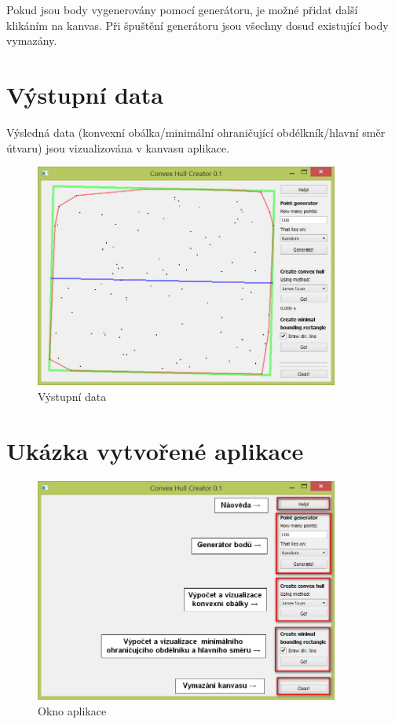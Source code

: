\documentclass[a4paper, 12pt]{article}
\begin{document}
Pokud jsou body vygenerovány pomocí generátoru, je možné přidat další klikáním na kanvas.
Při špuštění generátoru jsou všechny dosud existující body vymazány.

\clearpage
\section{Výstupní data}
Výsledná data (konvexní obálka/minimální ohraničující obdélkník/hlavní směr útvaru) jsou vizualizována v kanvasu aplikace.   \\
\begin{figure}[h]
	\centering
	\includegraphics[width=10cm]{min_bound.jpg}
	\caption{Výstupní data}
\end{figure}


\clearpage
\section{Ukázka vytvořené aplikace}
\begin{figure}[h!]
	\centering
	\includegraphics[width=10cm]{popis.jpg}
	\caption{Okno aplikace}
\end{figure}
\end{document}
